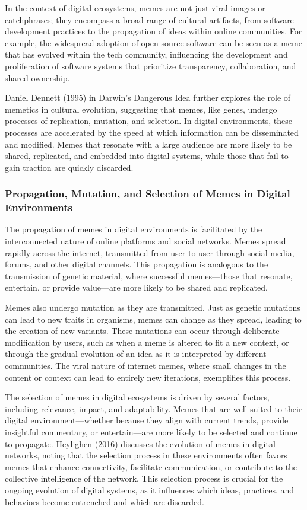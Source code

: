 \documentclass[12pt,twoside]{article}
\begin{document}
In the context of digital ecosystems, memes are not just viral images or catchphrases; they encompass a broad range of cultural artifacts, from software development practices to the propagation of ideas within online communities. For example, the widespread adoption of open-source software can be seen as a meme that has evolved within the tech community, influencing the development and proliferation of software systems that prioritize transparency, collaboration, and shared ownership.

Daniel Dennett (1995) in Darwin's Dangerous Idea further explores the role of memetics in cultural evolution, suggesting that memes, like genes, undergo processes of replication, mutation, and selection. In digital environments, these processes are accelerated by the speed at which information can be disseminated and modified. Memes that resonate with a large audience are more likely to be shared, replicated, and embedded into digital systems, while those that fail to gain traction are quickly discarded.

\subsubsection{Propagation, Mutation, and Selection of Memes in Digital Environments}

The propagation of memes in digital environments is facilitated by the interconnected nature of online platforms and social networks. Memes spread rapidly across the internet, transmitted from user to user through social media, forums, and other digital channels. This propagation is analogous to the transmission of genetic material, where successful memes—those that resonate, entertain, or provide value—are more likely to be shared and replicated.

Memes also undergo mutation as they are transmitted. Just as genetic mutations can lead to new traits in organisms, memes can change as they spread, leading to the creation of new variants. These mutations can occur through deliberate modification by users, such as when a meme is altered to fit a new context, or through the gradual evolution of an idea as it is interpreted by different communities. The viral nature of internet memes, where small changes in the content or context can lead to entirely new iterations, exemplifies this process.

The selection of memes in digital ecosystems is driven by several factors, including relevance, impact, and adaptability. Memes that are well-suited to their digital environment—whether because they align with current trends, provide insightful commentary, or entertain—are more likely to be selected and continue to propagate. Heylighen (2016) discusses the evolution of memes in digital networks, noting that the selection process in these environments often favors memes that enhance connectivity, facilitate communication, or contribute to the collective intelligence of the network. This selection process is crucial for the ongoing evolution of digital systems, as it influences which ideas, practices, and behaviors become entrenched and which are discarded.
\end{document}

